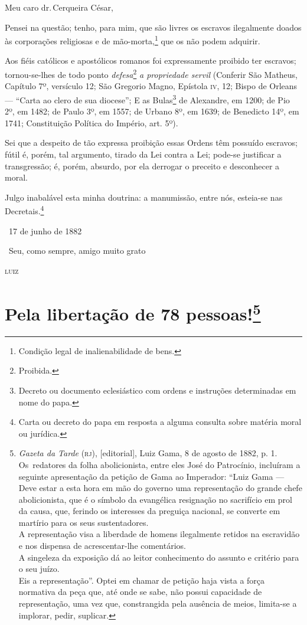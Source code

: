 Meu caro dr.\,Cerqueira César,

Pensei na questão; tenho, para mim, que são livres os escravos
ilegalmente doados às corporações religiosas e de mão-morta,\footnote{
  Condição legal de inalienabilidade de bens.} que os não podem
adquirir.

Aos fiéis católicos e apostólicos romanos foi expressamente proibido ter
escravos; tornou-se-lhes de todo ponto \emph{defesa}\footnote{
  Proibida.} \emph{a propriedade servil} (Conferir São
Matheus, Capítulo 7º, versículo 12; São Gregorio
Magno, Epístola \textsc{iv}, 12; Bispo de Orleans --- ``Carta ao
clero de sua diocese''; E as Bulas\footnote{Decreto ou documento
  eclesiástico com ordens e instruções determinadas em nome do papa.}
de Alexandre, em 1200; de Pio 2º, em 1482; de Paulo
3º, em 1557; de Urbano 8º, em 1639; de Benedicto 14º, em 1741;
Constituição Política do Império, art. 5º).

Sei que a despeito de tão expressa proibição essas Ordens têm possuído
escravos; fútil é, porém, tal argumento, tirado da Lei contra a Lei;
pode-se justificar a transgressão; é, porém, absurdo, por ela derrogar o
preceito e desconhecer a moral.

Julgo inabalável esta minha doutrina: a manumissão, entre nós, esteia-se
nas Decretais.\footnote{Carta ou decreto do papa em resposta a alguma
  consulta sobre matéria moral ou jurídica.}

\hfill\ 17 de junho de 1882

\hfill\ Seu, como sempre, amigo muito grato

\hfill\textsc{luiz}

\chapter{Pela libertação de 78 pessoas!\footnote{
\emph{Gazeta da Tarde} (\textsc{rj}), {[}editorial{]}, Luiz Gama, 8 de agosto de 1882,
  p. 1. Os~redatores da folha abolicionista, entre eles José do
  Patrocínio, incluíram a seguinte apresentação da petição de Gama ao
  Imperador: ``Luiz Gama --- Deve estar a esta hora em mão do
  governo uma representação do grande chefe abolicionista, que é o
  símbolo da evangélica resignação no sacrifício em prol da causa, que,
  ferindo os interesses da preguiça nacional, se converte em martírio
  para os seus sustentadores.\\
  A representação visa a liberdade de homens ilegalmente retidos na
  escravidão e nos dispensa de acrescentar-lhe comentários.\\
  A singeleza da exposição dá ao leitor conhecimento do assunto e
  critério para o seu juízo.\\
  Eis a representação''. Optei em chamar de petição haja vista a força
  normativa da peça que, até onde se sabe, não possui capacidade de
  representação, uma vez que, constrangida pela ausência de meios,
  limita-se a implorar, pedir, suplicar.}}

